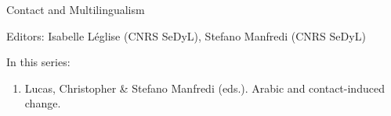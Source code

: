 {\large  Contact and Multilingualism}

\bigskip

Editors: Isabelle Léglise (CNRS SeDyL), Stefano Manfredi (CNRS SeDyL)  


\bigskip

In this series:

\begin{enumerate}
\item Lucas, Christopher \& Stefano Manfredi (eds.). Arabic and contact-induced change.
\end{enumerate}

\vfill

\gdef\lsISSN{??}%
